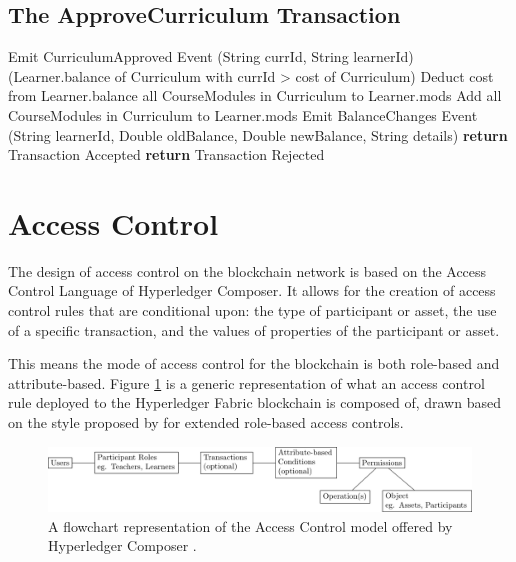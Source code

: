\clearpage
\subsection{The ApproveCurriculum Transaction}

\begin{algorithm}
	\begin{algorithmic}[0]
		Emit CurriculumApproved Event (String currId, String learnerId)
		\If (Learner.balance of Curriculum with currId > cost of Curriculum)
		\State Deduct cost from Learner.balance all CourseModules in Curriculum to Learner.mods
		\State Add all CourseModules in Curriculum to Learner.mods
		\State Emit BalanceChanges Event (String learnerId, Double oldBalance, Double newBalance, String details)
		\State \textbf{return} Transaction Accepted
		\Else
		\State \textbf{return} Transaction Rejected
		\EndIf
		\EndFunction
	\end{algorithmic}
\end{algorithm}

\section{Access Control}
The design of access control on the blockchain network is based on the Access Control Language of Hyperledger Composer.
It allows for the creation of access control rules that are conditional upon: the type of participant or asset,
the use of a specific transaction, and the values of properties of the participant or asset.

This means the mode of access control for the blockchain is both role-based and attribute-based.
Figure \ref{fig:ac_model} is a generic representation of what an access control rule deployed to the Hyperledger Fabric blockchain is composed of,
drawn based on the style proposed by \citet{poniszewska2005representation} for extended role-based access controls.\\

\begin{figure}[!ht]
	\centering
	\includegraphics[width=1.0\textwidth]{ac_model}
	\caption[Access Control Model of Hyperledger Composer]
	{A flowchart representation of the Access Control model offered by Hyperledger Composer \citep{official2018composer}.}
	\label{fig:ac_model}
\end{figure}

